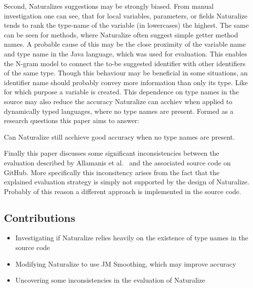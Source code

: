 Second, Naturalizes suggestions may be strongly biased. From manual investigation one can see, that for local variables, parameters, or fields Naturalize tends to rank the type-name of the variable (in lowercases) the highest. The same can be seen for methods, where Naturalize often suggest simple getter method names. A probable cause of this may be the close proximity of the variable name and type name in the Java language, which was used for evaluation. This enables the N-gram model to connect the to-be suggested identifier with other identifiers of the same type. Though this behaviour may be beneficial in some situations, an identifier name should probably convey more information than only its type. Like for which purpose a variable is created. This dependence on type names in the source may also reduce the accuracy Naturalize can acchiev when applied to dynamically typed languages, where no type names are present. Formed as a research questions this paper aims to answer:

\begin{resquest} \label{hyp:typeommitance}
Can Naturalize still acchieve good accuracy when no type names are present.
\end{resquest}

Finally this paper discusses some significant inconsistencies between the evaluation described by Allamanis et al.~\cite{naturalize} and the associated source code on GitHub. More specifically this inconsitency arises from the fact that the explained evaluation strategy is simply not supported by the design of Naturalize. Probably of this reason a different approach is implemented in the source code.

\subsection{Contributions}
\begin{itemize}
    \item Investigating if Naturalize relies heavily on the existence of type names in the source code
    \item Modifying Naturalize to use JM Smoothing, which may improve accuracy
    \item Uncovering some inconsistencies in the evaluation of Naturalize
\end{itemize}